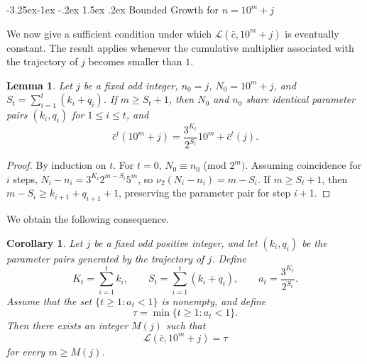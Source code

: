 \documentclass[11pt]{article}
\makeatletter
\renewcommand\subsection{\@startsection{subsection}{2}{\z@}
{-3.25ex\@plus -1ex \@minus -.2ex}
{1.5ex \@plus .2ex}
{\normalfont\normalsize\bfseries\boldmath}}
\theoremstyle{plain}
\newtheorem{lemma}{Lemma}
\newtheorem{corollary}{Corollary}
\theoremstyle{definition}
\theoremstyle{remark}
\makeatother
\begin{document}
\subsection{Bounded Growth for \texorpdfstring{$n = 10^m + j$}{n=10\^m+j}}

We now give a sufficient condition under which
$\mathcal{L}(\bar c,10^m+j)$ is eventually constant. The result applies
whenever the cumulative multiplier associated with the trajectory of
$j$ becomes smaller than $1$.


\begin{lemma}\label{lem:prefix-stability}
Let $j$ be a fixed odd integer, $n_0 = j$, $N_0 = 10^m + j$, and $S_t = \sum_{i=1}^t (k_i + q_i)$. If $m \ge S_t + 1$, then $N_0$ and $n_0$ share identical parameter pairs $(k_i, q_i)$ for $1 \le i \le t$, and
\begin{displaymath}
\bar{c}^t(10^m + j) = \frac{3^{K_t}}{2^{S_t}} 10^m + \bar{c}^t(j).
\end{displaymath}
\end{lemma}

\begin{proof}
By induction on $t$. For $t=0$, $N_0 \equiv n_0$ (mod ${2^m})$. Assuming coincidence for $i$ steps, $N_i - n_i = 3^{K_i} 2^{m - S_i} 5^m$, so $\nu_2(N_i - n_i) = m - S_i$. If $m \ge S_t + 1$, then $m - S_i \ge k_{i+1} + q_{i+1} + 1$, preserving the parameter pair for step $i+1$.
\end{proof}

We obtain the following consequence.
\begin{corollary}\label{cor:stopping-stability}
Let $j$ be a fixed odd positive integer, and let $(k_i,q_i)$ be the parameter pairs generated by the trajectory of $j$. Define
\begin{displaymath}
K_t=\sum_{i=1}^t k_i,\qquad S_t=\sum_{i=1}^t(k_i+q_i), \qquad a_t=\frac{3^{K_t}}{2^{S_t}}.
\end{displaymath}
Assume that the set $\{t\ge1:a_t<1\}$ is nonempty, and define
\begin{displaymath}
\tau=\min\{t\ge1:a_t<1\}.
\end{displaymath}
Then there exists an integer $M(j)$ such that
\begin{displaymath}
\mathcal{L}(\bar c,10^m+j)=\tau
\end{displaymath}
for every $m\ge M(j)$.
\end{corollary}
\end{document}
